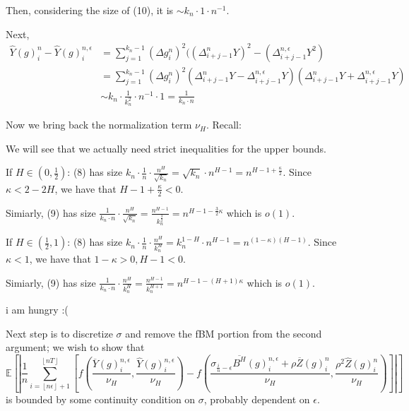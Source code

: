 \documentclass[12pt,letterpaper]{article}
\theoremstyle{definition}
\newcommand{\E}{\mathbb{E}}
\begin{document}
Then, considering the size of (10), it is \(\sim k_n \cdot 1 \cdot n^{-1}\).

Next,
\begin{align}
  \widehat{Y}(g)^{n}_i - \widehat{Y}(g)^{n,\epsilon}_i &= \sum_{j=1}^{k_n-1}(\Delta g^n_i)^2((\Delta_{i+j-1}^{n}Y)^2 - (\Delta_{i+j-1}^{n,\epsilon}Y^2) \\
                                                       &= \sum_{j=1}^{k_n-1}(\Delta g^n_i)^2(\Delta_{i+j-1}^{n}Y - \Delta_{i+j-1}^{n,\epsilon}Y)(\Delta_{i+j-1}^{n}Y + \Delta_{i+j-1}^{n,\epsilon}Y) \\
                                                       &\sim k_n \cdot \frac{1}{k_n^2} \cdot n^{-1} \cdot 1 = \frac{1}{k_n \cdot n}
\end{align}

Now we bring back the normalization term \(\nu_H\). Recall:

We will see that we actually need strict inequalities for the upper bounds.

If \( H \in (0, \frac{1}{2})\): (8) has size \(k_n \cdot \frac{1}{n} \cdot \frac{n^H}{\sqrt{k_n}} = \sqrt{k_n} \cdot n^{H - 1} = n^{H - 1 + \frac{\kappa}{2}}\). Since \(\kappa < 2 - 2H\), we have that \(H - 1 + \frac{\kappa}{2} < 0\).

Simiarly, (9) has size \(\frac{1}{k_n \cdot n} \cdot \frac{n^H}{\sqrt{k_n}} = \frac{n^{H-1}}{k_n^{\frac{3}{2}}} = n^{H - 1 - \frac{3}{2}\kappa}\) which is \(o(1)\).

If \( H \in (\frac{1}{2}, 1)\): (8) has size \(k_n \cdot \frac{1}{n} \cdot \frac{n^H}{k_n^H} = k_n^{1-H} \cdot n^{H - 1} = n^{(1 - \kappa)(H - 1)}\). Since \(\kappa < 1\), we have that \(1 - \kappa > 0, H - 1 < 0\).

Simiarly, (9) has size \(\frac{1}{k_n \cdot n} \cdot \frac{n^H}{k_n^H} = \frac{n^{H-1}}{k_n^{H + 1}} = n^{H - 1 - (H + 1)\kappa}\) which is \(o(1)\).

i am hungry :(

Next step is to discretize \(\sigma\) and remove the fBM portion from the second argument; we wish to show that
\begin{equation}
  \E \left[ \left| \frac{1}{n}\sum_{i=\left\lfloor n\epsilon \right\rfloor + 1}^{\left\lfloor nT \right\rfloor} \left[ f\left( \frac{\overline{Y}(g)^{n,\epsilon}_i}{\nu_H}, \frac{\widehat{Y}(g)^{n,\epsilon}_i}{\nu_H} \right) - f\left( \frac{\sigma_{\frac{i}{n}-\epsilon}\overline{B^H}(g)^{n,\epsilon}_i + \rho\overline{Z}(g)^n_i}{\nu_H}, \frac{\rho^2\widehat{Z}(g)^n_i}{\nu_H}\right)\right] \right| \right]
\end{equation}
is bounded by some continuity condition on \(\sigma\), probably dependent on \(\epsilon\).
\end{document}
